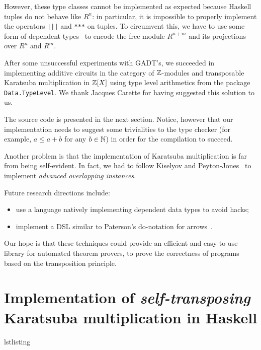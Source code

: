 However, these type classes cannot be implemented as expected because
Haskell tuples do not behave like $R^n$: in particular, it is
impossible to properly implement the operators \lstinline+|||+ and
\lstinline+***+ on tuples. To circumvent this, we have to use some
form of dependent types~\cite{kiselyov+lammel+schupke04,mcbride01} to
encode the free module $R^{n+m}$ and its projections over $R^n$ and
$R^m$.

After some unsuccessful experiments with GADT's, we succeeded in
implementing additive circuits in the category of $\mathbb{Z}$-modules and
transposable Karatsuba multiplication in $\mathbb{Z}[X]$ using type level
arithmetics from the package \lstinline+Data.TypeLevel+. We thank
Jacques Carette for having suggested this solution to us.

The source code is presented in the next section. Notice, however that
our implementation needs to suggest some trivialities to the type
checker (for example, $a\le a+b$ for any $b\in\mathbb{N}$) in order for the
compilation to succeed. 

Another problem is that the implementation of Karatsuba multiplication
is far from being self-evident. In fact, we had to follow Kiselyov and
Peyton-Jones~\cite{jones+kiselyov:advanced+overlap08} to implement
\emph{advanced overlapping instances}.

Future research directions include:
\begin{itemize}
\item use a language natively implementing dependent data types to
  avoid hacks;
\item implement a DSL similar to Paterson's do-notation for
  arrows~\cite{paterson01}.
\end{itemize}
Our hope is that these techniques could provide an efficient and easy
to use library for automated theorem provers, to prove the correctness
of programs based on the transposition principle.


\section[\emph{Self-transposing} Karatsuba
multiplication]{Implementation of \emph{self-transposing} Karatsuba
  multiplication in Haskell}
\label{sec:impl-emphs-transp}


\begin{xcomment}{lstlisting}

\end{xcomment}



\renewcommand{\C}{\mathbb{C}}



%
